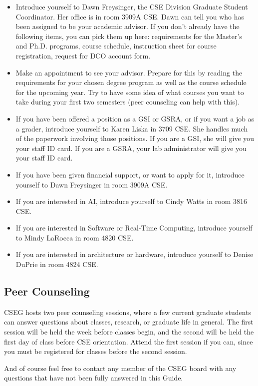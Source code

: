 \documentclass[11pt]{article}
\begin{document}
\begin{itemize}
\item Introduce yourself to Dawn Freysinger, the CSE Division Graduate Student Coordinator.  Her office is in room 3909A CSE.  Dawn can tell you who has been assigned to be your academic advisor.  If you don't already have the following items, you can pick them up here:  requirements for the Master’s and Ph.D. programs, course schedule, instruction sheet for course registration, request for DCO account form.
\item Make an appointment to see your advisor.  Prepare for this by reading the requirements for your chosen degree program as well as the course schedule for the upcoming year.  Try to have some idea of what courses you want to take during your first two semesters (peer counseling can help with this).
\item If you have been offered a position as a GSI or GSRA, or if you want a job as a grader, introduce yourself to Karen Liska in 3709 CSE.  She handles much of the paperwork involving those positions. If you are a GSI, she will give you your staff ID card.  If you are a GSRA, your lab administrator will give you your staff ID card.
\item If you have been given financial support, or want to apply for it, introduce yourself to Dawn Freysinger in room 3909A CSE.
\item If you are interested in AI, introduce yourself to Cindy Watts in room 3816 CSE.
\item If you are interested in Software or Real-Time Computing, introduce yourself to Mindy LaRocca in room 4820 CSE.
\item If you are interested in architecture or hardware, introduce yourself to Denise DuPrie in room 4824 CSE.
\end{itemize}
\subsection{Peer Counseling}
\label{sec-15_1}

CSEG hosts two peer counseling sessions, where a few current graduate
students can answer questions about classes, research, or graduate
life in general.  The first session will be held the week before
classes begin, and the second will be held the first day of class
before CSE orientation.  Attend the first session if you can, since
you must be registered for classes before the second session.

And of course feel free to contact any member of the CSEG board with
any questions that have not been fully answered in this Guide.
\end{document}
